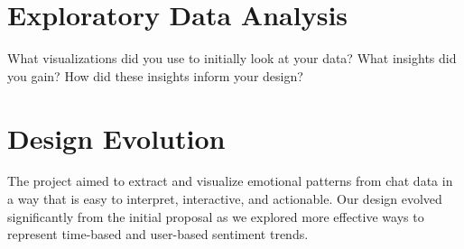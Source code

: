 \documentclass{article}\usepackage{graphicx}
\begin{document}
\section*{Exploratory Data Analysis}
What visualizations did you use to initially look at your data? What insights did you gain? How did these insights inform your design?

\section*{Design Evolution}
The project aimed to extract and visualize emotional patterns from chat data in a way that is easy to interpret, interactive, and actionable. Our design evolved significantly from the initial proposal as we explored more effective ways to represent time-based and user-based sentiment trends.
\end{document}
